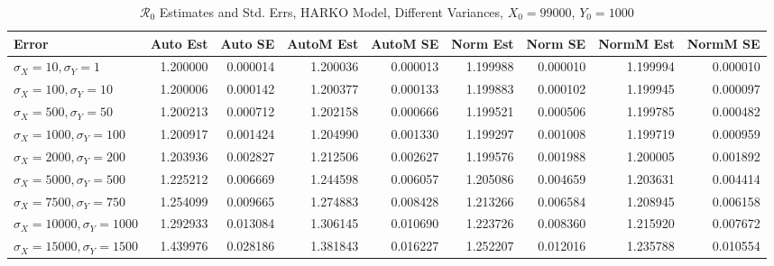 \documentclass[12pt]{article}
\newcommand{\rr}{\ensuremath{\mathcal{R}_0}}
\begin{document}
\begin{table}[H]
	
	\caption{$\rr$ Estimates and Std. Errs, HARKO Model, 
		Different Variances, $X_0 = 99000$, $Y_0 = 1000$}
	\begin{footnotesize}
		\hskip -1.7cm
		\begin{tabular}{l|r|r|r|r|r|r|r|r}
			\hline
			Error & Auto Est & Auto SE & AutoM Est & AutoM SE & Norm Est & Norm SE & NormM Est & NormM SE\\
			\hline
			$\sigma_X = 10, \sigma_Y = 1$ & 1.200000 & 0.000014 & 1.200036 & 0.000013 & 1.199988 & 0.000010 & 1.199994 & 0.000010\\
			\hline
			$\sigma_X = 100, \sigma_Y = 10$ & 1.200006 & 0.000142 & 1.200377 & 0.000133 & 1.199883 & 0.000102 & 1.199945 & 0.000097\\
			\hline
			$\sigma_X = 500, \sigma_Y = 50$ & 1.200213 & 0.000712 & 1.202158 & 0.000666 & 1.199521 & 0.000506 & 1.199785 & 0.000482\\
			\hline
			$\sigma_X = 1000, \sigma_Y = 100$ & 1.200917 & 0.001424 & 1.204990 & 0.001330 & 1.199297 & 0.001008 & 1.199719 & 0.000959\\
			\hline
			$\sigma_X = 2000, \sigma_Y = 200$ & 1.203936 & 0.002827 & 1.212506 & 0.002627 & 1.199576 & 0.001988 & 1.200005 & 0.001892\\
			\hline
			$\sigma_X = 5000, \sigma_Y = 500$ & 1.225212 & 0.006669 & 1.244598 & 0.006057 & 1.205086 & 0.004659 & 1.203631 & 0.004414\\
			\hline
			$\sigma_X = 7500, \sigma_Y = 750$ & 1.254099 & 0.009665 & 1.274883 & 0.008428 & 1.213266 & 0.006584 & 1.208945 & 0.006158\\
			\hline
			$\sigma_X = 10000, \sigma_Y = 1000$ & 1.292933 & 0.013084 & 1.306145 & 0.010690 & 1.223726 & 0.008360 & 1.215920 & 0.007672\\
			\hline
			$\sigma_X = 15000, \sigma_Y = 1500$ & 1.439976 & 0.028186 & 1.381843 & 0.016227 & 1.252207 & 0.012016 & 1.235788 & 0.010554\\
			\hline
		\end{tabular}
	\end{footnotesize}
\end{table}
\end{document}
